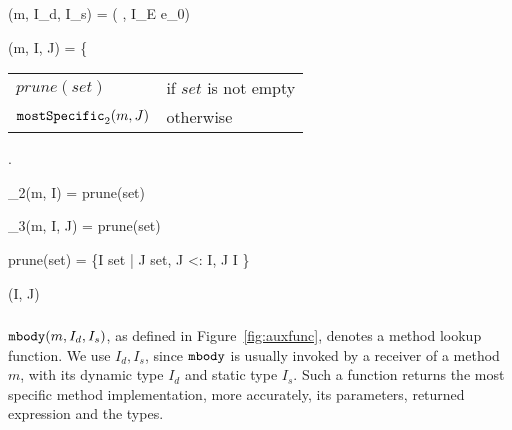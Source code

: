 \begin{figure*}[htbp]
	\begin{mathpar}
		{\mbody(m, I_d, I_s) = ( \; , I_E \; e_0)}
	
	{\mostSpecific(m, I, J) = \left\{{\begin{tabular}{ll}
				$prune(set)$ & if $set$ is not empty \\ $\texttt{mostSpecific}_2(m, J)$ & otherwise
			\end{tabular}}\right.}
		{\mostSpecific_2(m, I) = prune(set)}
	
		{\mostSpecific_3(m, I, J) = prune(set)}
	
	prune(set) = \{I \in set \; | \; \nexists J \in set, J <: I, J \neq I \}
	
	{\ext(I, J)}
	\end{mathpar}
	\caption{Auxiliary functions.}\label{fig:auxfunc}
\end{figure*}


\subsubsection{\mbody}

$\texttt{mbody}(m, I_d, I_s)$, as defined in Figure~\ref{fig:auxfunc}, denotes a method lookup function.
We use $I_d, I_s$, since $\texttt{mbody}$ is usually invoked by a receiver of a method $m$, with its dynamic
type $I_d$ and static type $I_s$. Such a function returns the most specific method implementation, more
accurately, its parameters, returned expression and the types.

